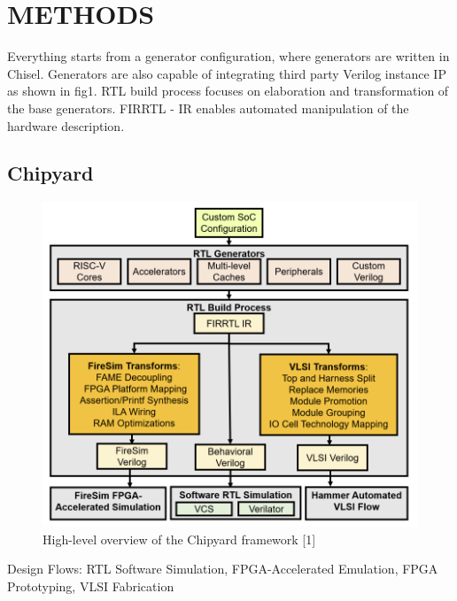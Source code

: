\documentclass[conference]{IEEEtran}
\begin{document}
\section{METHODS}
Everything starts from a generator configuration, where generators are written in Chisel. Generators are also capable of integrating third party Verilog instance IP as shown in fig1. RTL build process focuses on elaboration and transformation of the base generators. FIRRTL - IR enables automated manipulation of the hardware description.

\subsection{Chipyard}


\begin{figure}[htbp]
\centerline{\includegraphics{Chipyard.png}}
\caption{High-level overview of the Chipyard framework [1]}
\label{fig}
\end{figure}

Design Flows: 
RTL Software Simulation, FPGA-Accelerated Emulation, FPGA Prototyping, VLSI Fabrication
\end{document}
